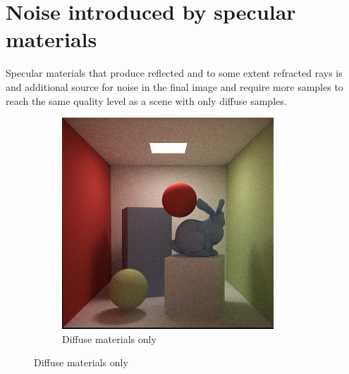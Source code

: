 \documentclass[a4paper, 12pt]{report}
\begin{document}
\section{Noise introduced by specular materials}
Specular materials that produce reflected and to some extent refracted rays is and additional source for noise in the final image and require more samples to reach the same quality level as a scene with only diffuse samples.

\begin{figure}
        \centering
        \begin{subfigure}[b]{0.65\textwidth}
                \includegraphics[width=\textwidth]{figures/diffuse-100rpp-.png}
                \caption{Diffuse materials only}
                \label{fig:diff_spec1}
        \end{subfigure}%


\end{figure}
\end{document}
